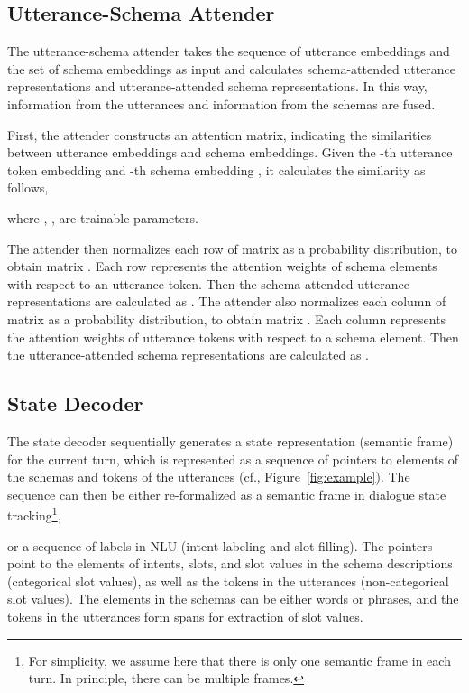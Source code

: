 \documentclass[11pt]{article}
\begin{document}
\subsection{Utterance-Schema Attender}

The utterance-schema attender takes the sequence of utterance embeddings and the set of schema embeddings as input and calculates schema-attended utterance representations and utterance-attended schema representations. In this way, information from the utterances and information from the schemas are fused.

First, the attender constructs an attention matrix, indicating the similarities between utterance embeddings and schema embeddings. Given the -th   utterance token embedding  and -th schema embedding , it calculates the similarity as follows,

where , ,  are trainable parameters. 



The attender then normalizes each row of matrix  as a probability distribution, to obtain matrix . Each row represents the attention weights of schema elements with respect to an utterance token. Then the schema-attended utterance representations are calculated as . The attender also normalizes each column of matrix  as a probability distribution, to obtain matrix . Each column represents the attention weights of utterance tokens with respect to a schema element. Then the utterance-attended schema representations are calculated as .



\subsection{State Decoder}

The state decoder sequentially generates a state representation (semantic frame) for the current turn, which is represented as a sequence of pointers to elements of the schemas and tokens of the utterances (cf., Figure~\ref{fig:example}). The sequence can then be either re-formalized as a semantic frame in dialogue state tracking\footnote{For simplicity, we assume here that there is only one semantic frame in each turn. In principle, there can be multiple frames.},

or a sequence of labels in NLU (intent-labeling and slot-filling). The pointers point to the elements of intents, slots, and slot values in the schema descriptions (categorical slot values), as well as the tokens in the utterances (non-categorical slot values). The elements in the schemas can be either words or phrases, and the tokens in the utterances form spans for extraction of slot values. 
\end{document}
